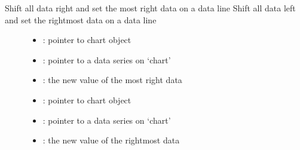 \documentclass[letterpaper,10pt,english]{sphinxmanual}
\begin{document}
\begin{fulllineitems}
\label{\detokenize{object-types/chart:_CPPv417lv_chart_set_nextP8lv_obj_tP17lv_chart_series_t10lv_coord_t}}%
\pysigstartmultiline
{}\label{\detokenize{object-types/chart:lv__chart_8h_1a39dc65670b6c2ec8747690314ca28190}}%
\pysigstopmultiline
Shift all data right and set the most right data on a data line 
Shift all data left and set the rightmost data on a data line 
\begin{description}
\item[{}] \leavevmode\begin{itemize}
\item {} 
: pointer to chart object 

\item {} 
: pointer to a data series on ‘chart’ 

\item {} 
: the new value of the most right data

\end{itemize}

\item[{}] \leavevmode\begin{itemize}
\item {} 
: pointer to chart object 

\item {} 
: pointer to a data series on ‘chart’ 

\item {} 
: the new value of the rightmost data 

\end{itemize}

\end{description}


\end{fulllineitems}

\end{document}
